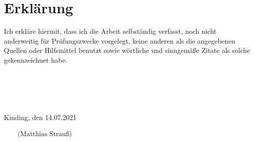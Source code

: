 \chapter*{Erklärung}
Ich erkläre hiermit, dass ich die Arbeit selbständig verfasst, noch nicht anderweitig für 
Prüfungszwecke vorgelegt, keine anderen als die angegebenen Quellen oder Hilfsmittel 
benutzt sowie wörtliche und sinngemäße Zitate als solche gekennzeichnet habe.\\\\\\
\\\\\\
\noindent Kinding, den 14.07.2021
\begin{flushright}
$\overline{~~~~~~~~~\mbox{(Matthias Strauß)}~~~~~~~~~}$
\end{flushright}\newpage